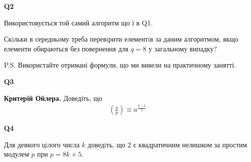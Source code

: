 \documentclass{../../test-template}
\begin{document}
\begin{tcolorbox}[lowerbox=invisible,colback=white]
    \begin{minipage}{0.1\textwidth}
        \raggedright
        \vspace*{\fill}
            \textbf{Q2}
        \vspace*{\fill}
        \end{minipage}
        \begin{minipage}{0.75\textwidth}
        Використовується той самий алгоритм що і в Q1.
        
        Скiльки в середньому треба перевiрити елементiв за даним алгоритмом, якщо елементи обираються без повернення для  $q=8$ у загальному випадку?

        P.S. Використайте отримані формули, що ми вивели на практичному занятті.
        \end{minipage}
\end{tcolorbox}

\begin{tcolorbox}[lowerbox=invisible,colback=white]
    \begin{minipage}{0.1\textwidth}
        \raggedright
        \vspace*{\fill}
            \textbf{Q3}
        \vspace*{\fill}
        \end{minipage}
        \begin{minipage}{0.75\textwidth}
        \textbf{Критерій Ойлера.} Доведіть, що 
        \begin{align*}
            \left(\frac{a}{p}\right)\equiv a^{\frac{p-1}{2}}
        \end{align*}
        \end{minipage}
\end{tcolorbox}
\begin{tcolorbox}[lowerbox=invisible,colback=white]
    \begin{minipage}{0.1\textwidth}
        \raggedright
        \vspace*{\fill}
            \textbf{Q4}
        \vspace*{\fill}
        \end{minipage}
        \begin{minipage}{0.75\textwidth}
       Для деякого цiлого числа $k$ доведiть, що $2$ є квадратичним
нелишком за простим модулем $p$ при $p = 8k + 5$.
        \end{minipage}
\end{tcolorbox}
\end{document}

